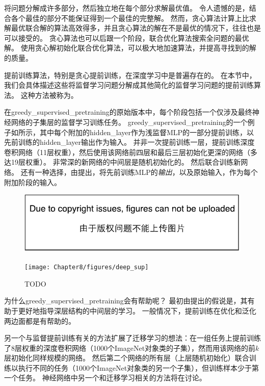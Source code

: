 将问题分解成许多部分，然后独立地在每个部分求解最优值。
令人遗憾的是，结合各个最佳的部分不能保证得到一个最佳的完整解。
然而，贪心算法计算上比求解最优联合解的算法高效得多，并且贪心算法的解在不是最优的情况下，往往也是可以接受的。
贪心算法也可以后跟一个阶段，联合优化算法搜索全问题的最优解。
使用贪心解初始化联合优化算法，可以极大地加速算法，并提高寻找到的解的质量。

提前训练算法，特别是贪心提前训练，在深度学习中是普遍存在的。
在本节中，我们会具体描述这些将监督学习问题分解成其他简化的监督学习问题的提前训练算法。
这种方法被称为。


在\gls{greedy_supervised_pretraining}的原始版本\citep{Bengio-nips-2006-short}中，每个阶段包括一个仅涉及最终神经网络的子集层的监督学习训练任务。
\gls{greedy_supervised_pretraining}的一个例子如所示，其中每个附加的\gls{hidden_layer}作为浅监督MLP的一部分提前训练，以先前训练的\gls{hidden_layer}输出作为输入。
并非一次提前训练一层，\cite{Simonyan2015}提前训练深度卷积网络（11层权重），然后使用该网络前四层和最后三层初始化更深的网络（多达19层权重）。
非常深的新网络的中间层是随机初始化的。
然后联合训练新网络。
还有一种选择，由\cite{Yu+al-2010}提出，将先前训练MLP的\emph{输出}，以及原始输入，作为每个附加阶段的输入。

\begin{figure}[!htb]
\ifOpenSource
\centerline{\includegraphics{figure.pdf}}
\else
\centerline{\texttt{[image: Chapter8/figures/deep\_sup]}}
\fi
\caption{TODO}
\label{fig:chap8_deep_sup}
\end{figure}


为什么\gls{greedy_supervised_pretraining}会有帮助呢？
最初由\cite{Bengio-nips-2006}提出的假说是，其有助于更好地指导深层结构的中间层的学习。
一般情况下，提前训练在优化和泛化两边面都是有帮助的。

另一个与监督提前训练有关的方法扩展了迁移学习的想法：\cite{yosinski-nips2014}在一组任务上提前训练了$8$层权重的深度卷积网络（1000个ImageNet对象类的子集），然而用该网络的前$k$层初始化同样规模的网络。
然后第二个网络的所有层（上层随机初始化）联合训练以执行不同的任务（1000个ImageNet对象类的另一个子集），但训练样本少于第一个任务。
神经网络中另一个和迁移学习相关的方法将在讨论。

